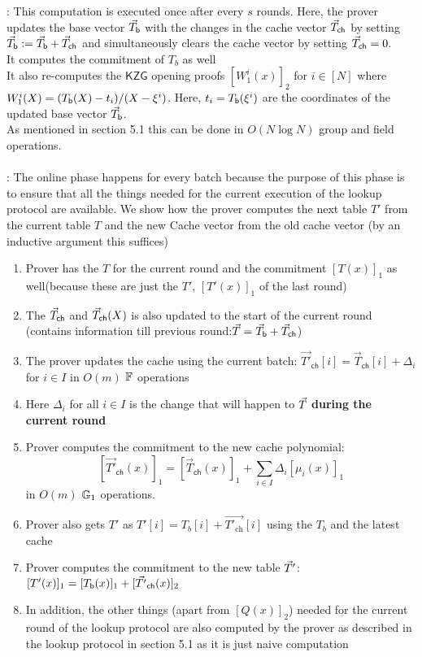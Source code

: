 : This computation is executed once after every $s$ rounds. Here, the prover updates the base vector $\vec{T}_{\mathsf{b}}$ with the changes in the cache vector
$\vec{T}_{\mathsf{ch}}$ by setting $\vec{T}_{\mathsf{b}} := \vec{T}_{\mathsf{b}} + \vec{T}_{\mathsf{ch}}$ and simultaneously clears the cache vector by setting
$\vec{T}_{\mathsf{ch}} = 0$.\\
It computes the commitment of $T_b$ as well\\
It also re-computes the $\mathsf{KZG}$ opening proofs $[W_1^i(x)]_2$ for $i\in [N]$ where
$W_1^i(X) = (T_{\mathsf{b}}({X}) - t_i)/(X-\xi^i)$. Here, $t_i=T_{\mathsf{b}}({\xi^i})$ are the coordinates
of the updated base vector $\vec{T}_{\mathsf{b}}$.\\
As mentioned in section 5.1 this can be done in $O(N\log N)$ group and field operations.\\\\
:
The online phase happens for every batch because the purpose of this phase is to ensure that all the things needed for the current execution of the lookup protocol are available. We show how the prover computes the next table $T'$ from the current table $T$ and the new Cache vector from the old cache vector (by an inductive argument this suffices)
\begin{enumerate}[leftmargin=1em]
    \item Prover has the $T$ for the current round and the commitment $[T(x)]_1$ as well(because these are just the $T'$, $[T'(x)]_1$ of the last round)
    \item The $\vec{T}_{\mathsf{ch}}$ and $\vec{T}_{\mathsf{ch}}(X)$ is also updated to the start of the current round (contains information till previous round:$\vec{T}=\vec{T}_{\mathsf{b}}+\vec{T}_{\mathsf{ch}}$)
    \item The prover updates the cache using the current batch: $\vec{T'}_{\mathsf{ch}}[i] = \vec{T}_{\mathsf{ch}}[i] + \Delta_i$ for $i\in I$ in $O(m)$ $\mathbb{F}$ operations
    \item Here $\Delta_i$ for all $i \in I$ is the change that will happen to $\vec{T}$ \textbf{during the current round}
    \item Prover computes the commitment to the new cache polynomial:
    $$[\vec{T'}_{\mathsf{ch}}(x)]_1=[\vec{T}_{\mathsf{ch}}(x)]_1+\sum_{i\in I}\Delta_i[\mu_i(x)]_1$$ in
    $O(m)$ $\mathbb{G}_1$ operations.
    \item Prover also gets ${T}'$ as ${T'}[i]=T_b[i]+ \vec{T'_{\text{ch}}}[i]$ using the $T_b$ and the latest cache
    \item Prover computes the commitment to the new table $\vec{T}'$: $[T'(x)]_1=[T_{\mathsf{b}}({x})]_1+[\vec{T'}_{\mathsf{ch}}(x)]_2$

    \item In addition, the other things (apart from $[Q(x)]_2$) needed for the current round of the lookup protocol are also computed by the prover as described in the lookup protocol in section 5.1 as it is just naive computation



\end{enumerate}


